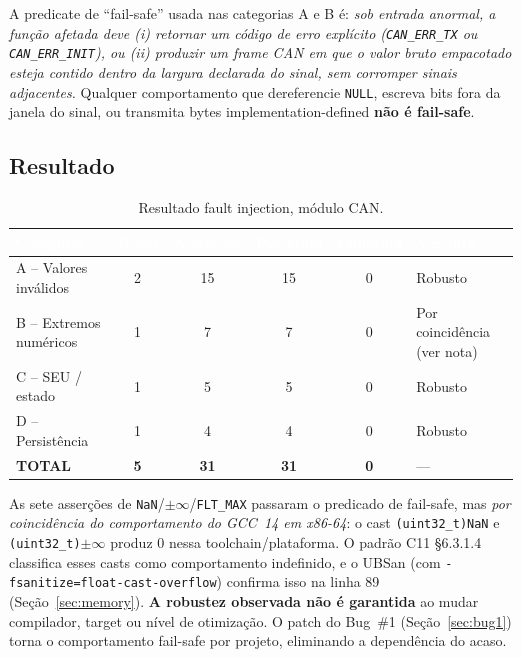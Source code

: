 \documentclass[12pt]{article}
\begin{document}
A predicate de ``fail-safe'' usada nas categorias A e B é:
\emph{sob entrada anormal, a função afetada deve (i) retornar um código de erro explícito
(\texttt{CAN\_ERR\_TX} ou \texttt{CAN\_ERR\_INIT}), ou (ii) produzir um frame CAN em que o valor
bruto empacotado esteja contido dentro da largura declarada do sinal, sem corromper sinais
adjacentes.} Qualquer comportamento que dereferencie \texttt{NULL}, escreva bits fora da janela do
sinal, ou transmita bytes implementation-defined \textbf{não é fail-safe}.

\subsection{Resultado}

\begin{table}[H]
\centering
\caption{Resultado fault injection, módulo CAN.}
\scriptsize
\setlength{\tabcolsep}{4pt}
\begin{tabular}{|l|c|c|c|c|l|}
\hline
\rowcolor{sectionblue}
\textcolor{white}{\textbf{Categoria}} &
\textcolor{white}{\textbf{Testes}} &
\textcolor{white}{\textbf{Asserções}} &
\textcolor{white}{\textbf{Passaram}} &
\textcolor{white}{\textbf{Falharam}} &
\textcolor{white}{\textbf{Veredito}} \\ \hline
A -- Valores inválidos  & 2  & 15 & 15 & 0 & Robusto \\ \hline
B -- Extremos numéricos & 1  & 7  & 7  & 0 & Por coincidência (ver nota) \\ \hline
C -- SEU / estado       & 1  & 5  & 5  & 0 & Robusto \\ \hline
D -- Persistência       & 1  & 4  & 4  & 0 & Robusto \\ \hline
\textbf{TOTAL}          & \textbf{5} & \textbf{31} & \textbf{31} & \textbf{0} & --- \\ \hline
\end{tabular}
\end{table}

\begin{tcolorbox}[colback=red!5, colframe=red!50!black,
                  title=\textbf{Nota sobre a Categoria~B (extremos numéricos)}]
As sete asserções de \texttt{NaN}/$\pm\infty$/\texttt{FLT\_MAX} passaram o predicado de fail-safe, mas
\textit{por coincidência do comportamento do GCC~14 em x86-64}: o cast \texttt{(uint32\_t)NaN} e
\texttt{(uint32\_t)}$\pm\infty$ produz 0 nessa toolchain/plataforma. O padrão C11 \S6.3.1.4 classifica
esses casts como comportamento indefinido, e o UBSan (com \texttt{-fsanitize=float-cast-overflow})
confirma isso na linha 89 (Seção~\ref{sec:memory}). \textbf{A robustez observada não é garantida} ao
mudar compilador, target ou nível de otimização. O patch do Bug~\#1 (Seção~\ref{sec:bug1}) torna o
comportamento fail-safe por projeto, eliminando a dependência do acaso.
\end{tcolorbox}
\end{document}
